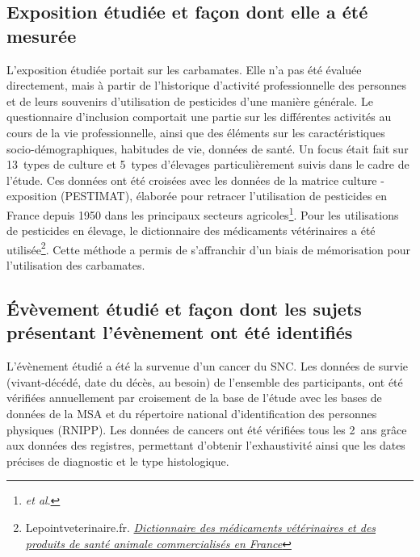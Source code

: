 \documentclass[10pt,english,french]{article}
\begin{document}
\subsection{Exposition étudiée et façon dont elle a été mesurée}
\label{exposition}
L'exposition étudiée portait sur les carbamates. Elle n'a pas été évaluée directement, mais à partir de l'historique d'activité professionnelle des personnes et de leurs souvenirs d'utilisation de pesticides d'une manière générale. Le questionnaire d'inclusion comportait une partie sur les différentes activités au cours de la vie professionnelle, ainsi que des éléments sur les caractéristiques socio-démographiques, habitudes de vie, données de santé. Un focus était fait sur 13~types de culture et 5~types d'élevages particulièrement suivis dans le cadre de l'étude. Ces données ont été croisées avec les données de la matrice culture - exposition (PESTIMAT), élaborée pour retracer l'utilisation de pesticides en France depuis 1950 dans les principaux secteurs agricoles\footnote{ \emph{et al}. }. Pour les utilisations de pesticides en élevage, le dictionnaire des médicaments vétérinaires a été utilisée\footnote{Lepointveterinaire.fr. \emph{\href{https://www.lepointveterinaire.fr/dmv/consulter.html}{Dictionnaire des médicaments vétérinaires et des produits de santé animale commercialisés en France}}}. Cette méthode a permis de s'affranchir d'un biais de mémorisation pour l'utilisation des carbamates.

\subsection{\'{E}vèvement étudié et façon dont les sujets présentant l'évènement ont été identifiés}
L'évènement étudié a été la survenue d'un cancer du SNC. Les données de survie (vivant-décédé, date du décès, au besoin) de l'ensemble des participants, ont été vérifiées annuellement par croisement de la base de l'étude avec les bases de données de la MSA et du répertoire national d'identification des personnes physiques (RNIPP). Les données de cancers ont été vérifiées tous les 2~ans grâce aux données des registres, permettant d'obtenir l'exhaustivité ainsi que les dates précises de diagnostic et le type histologique.
\end{document}
